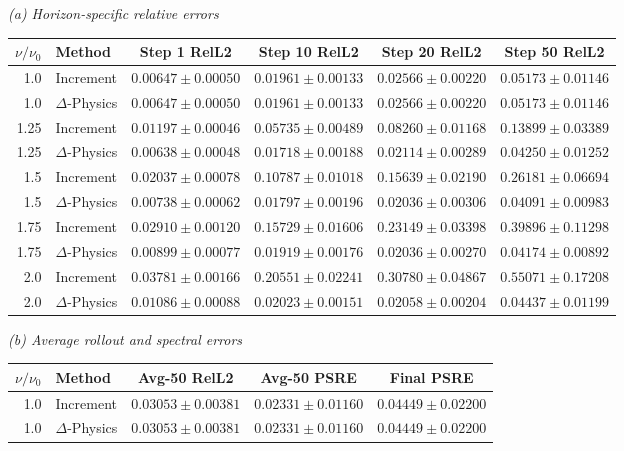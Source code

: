 \begin{table}[!htbp]
\centering
\small
\setlength{\tabcolsep}{4pt}
\renewcommand{\arraystretch}{1.12}
\textit{(a) Horizon-specific relative errors}\par\smallskip
\begin{tabular}{@{}rlcccc@{}}
\toprule
$\nu/\nu_0$ & Method & Step 1 RelL2 & Step 10 RelL2 & Step 20 RelL2 & Step 50 RelL2 \\
\midrule
1.0 & Increment & $0.00647\pm0.00050$ & $0.01961\pm0.00133$ & $0.02566\pm0.00220$ & $0.05173\pm0.01146$ \\
1.0 & $\Delta$-Physics & $0.00647\pm0.00050$ & $0.01961\pm0.00133$ & $0.02566\pm0.00220$ & $0.05173\pm0.01146$ \\
1.25 & Increment & $0.01197\pm0.00046$ & $0.05735\pm0.00489$ & $0.08260\pm0.01168$ & $0.13899\pm0.03389$ \\
1.25 & $\Delta$-Physics & $0.00638\pm0.00048$ & $0.01718\pm0.00188$ & $0.02114\pm0.00289$ & $0.04250\pm0.01252$ \\
1.5 & Increment & $0.02037\pm0.00078$ & $0.10787\pm0.01018$ & $0.15639\pm0.02190$ & $0.26181\pm0.06694$ \\
1.5 & $\Delta$-Physics & $0.00738\pm0.00062$ & $0.01797\pm0.00196$ & $0.02036\pm0.00306$ & $0.04091\pm0.00983$ \\
1.75 & Increment & $0.02910\pm0.00120$ & $0.15729\pm0.01606$ & $0.23149\pm0.03398$ & $0.39896\pm0.11298$ \\
1.75 & $\Delta$-Physics & $0.00899\pm0.00077$ & $0.01919\pm0.00176$ & $0.02036\pm0.00270$ & $0.04174\pm0.00892$ \\
2.0 & Increment & $0.03781\pm0.00166$ & $0.20551\pm0.02241$ & $0.30780\pm0.04867$ & $0.55071\pm0.17208$ \\
2.0 & $\Delta$-Physics & $0.01086\pm0.00088$ & $0.02023\pm0.00151$ & $0.02058\pm0.00204$ & $0.04437\pm0.01199$ \\
\bottomrule
\end{tabular}\par\medskip
\textit{(b) Average rollout and spectral errors}\par\smallskip
\begin{tabular}{@{}rlccc@{}}
\toprule
$\nu/\nu_0$ & Method & Avg-50 RelL2 & Avg-50 PSRE & Final PSRE \\
\midrule
1.0 & Increment & $0.03053\pm0.00381$ & $0.02331\pm0.01160$ & $0.04449\pm0.02200$ \\
1.0 & $\Delta$-Physics & $0.03053\pm0.00381$ & $0.02331\pm0.01160$ & $0.04449\pm0.02200$ \\

\end{tabular}
\end{table}
